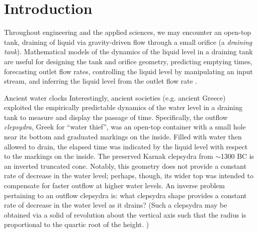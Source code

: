 \documentclass[openacc]{rsproca_new}%
\begin{document}
\rsbreak


\section{Introduction}
Throughout engineering and the applied sciences, we may encounter an open-top tank, draining of liquid via gravity-driven flow through a small orifice (a \emph{draining tank}).
Mathematical models of the dynamics of the liquid level in a draining tank are useful for designing the tank and orifice geometry, predicting emptying times, forecasting outlet flow rates, controlling the liquid level by manipulating an input stream, and inferring the liquid level from the outlet flow rate \cite{d2021torricelli,seborg2016process,groetsch1993inverse,groetsch1999inverse}.

\begin{mytcbox}[label=box:waterclocks, breakable]{Ancient water clocks}
Interestingly, ancient societies (e.g. ancient Greece) exploited the empirically predictable dynamics of the water level in a draining tank to measure and display the passage of time.
Specifically, the outflow \emph{clepsydra}, Greek for ``water thief'', was an open-top container with a small hole near its bottom and graduated markings on the inside. 
Filled with water then allowed to drain, the elapsed time was indicated by the liquid level with respect to the markings on the inside. \cite{bedini1962compartmented,hwang2021historical,ritner2016oriental,hejun1987research,schomberg2018karnak,mills1982newton}
The preserved Karnak clepsydra from $\sim$1300 BC \cite{schomberg2018karnak} is an inverted truncated cone. Notably, this geometry does not provide a constant rate of decrease in the water level; perhaps, though, its wider top was intended to compensate for faster outflow at higher water levels. An inverse problem pertaining to an outflow clepsydra is: what clepsydra shape provides a constant rate of decrease in the water level as it drains?
(Such a clepsydra may be obtained via a solid of revolution about the vertical axis such that the radius is proportional to the quartic root of the height. \cite{mills1982newton,d2021torricelli})
\end{mytcbox}
\end{document}
